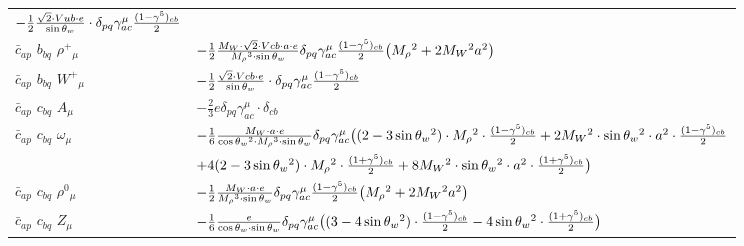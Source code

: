 \begin{center}
\begin{tabular}{|l|l|}
	$-\frac{1}{2}\frac{\sqrt{2} \cdot Vub \cdot e}{ \sin{\theta}_w}\cdot \delta_{p q} \gamma_{a c}^\mu {(1-\gamma^5)_{c b}\over 2} $\\[2mm]
$\bar{c}{}_{a p }$ \phantom{-} $b{}_{b q }$ \phantom{-} $\rho^+{}_{\mu }$ \phantom{-}  &
	$-\frac{1}{2}\frac{ M_W \cdot\sqrt{2} \cdot Vcb \cdot a \cdot e}{ M_\rho{}^3  \cdot \sin{\theta}_w}\delta_{p q} \gamma_{a c}^\mu {(1-\gamma^5)_{c b}\over 2} \big( M_\rho{}^2 +2 M_W{}^2  a{}^2 \big)$\\[2mm]
$\bar{c}{}_{a p }$ \phantom{-} $b{}_{b q }$ \phantom{-} $W^+{}_{\mu }$ \phantom{-}  &
	$-\frac{1}{2}\frac{\sqrt{2} \cdot Vcb \cdot e}{ \sin{\theta}_w}\cdot \delta_{p q} \gamma_{a c}^\mu {(1-\gamma^5)_{c b}\over 2} $\\[2mm]
$\bar{c}{}_{a p }$ \phantom{-} $c{}_{b q }$ \phantom{-} ${A}_{\mu }$ \phantom{-}  &
	$-\frac{2}{3} e\delta_{p q} \gamma_{a c}^\mu \cdot \delta_{c b} $\\[2mm]
$\bar{c}{}_{a p }$ \phantom{-} $c{}_{b q }$ \phantom{-} $\omega{}_{\mu }$ \phantom{-}  &
	$-\frac{1}{6}\frac{ M_W \cdot a \cdot e}{ \cos{\theta}_w{}^2  \cdot M_\rho{}^3  \cdot \sin{\theta}_w}\delta_{p q} \gamma_{a c}^\mu \big( (2-3 \sin{\theta}_w {}^2)\cdot  M_\rho{}^2 \cdot {(1-\gamma^5)_{c b}\over 2} +2 M_W{}^2 \cdot  \sin{\theta}_w{}^2 \cdot  a{}^2 \cdot {(1-\gamma^5)_{c b}\over 2} $ \\[2mm]
  & $+4 (2-3 \sin{\theta}_w {}^2)\cdot  M_\rho{}^2 \cdot {(1+\gamma^5)_{c b}\over 2} +8 M_W{}^2 \cdot  \sin{\theta}_w{}^2 \cdot  a{}^2 \cdot {(1+\gamma^5)_{c b}\over 2} \big)$\\[2mm]
$\bar{c}{}_{a p }$ \phantom{-} $c{}_{b q }$ \phantom{-} $\rho^0{}_{\mu }$ \phantom{-}  &
	$-\frac{1}{2}\frac{ M_W \cdot a \cdot e}{ M_\rho{}^3  \cdot \sin{\theta}_w}\delta_{p q} \gamma_{a c}^\mu {(1-\gamma^5)_{c b}\over 2} \big( M_\rho{}^2 +2 M_W{}^2  a{}^2 \big)$\\[2mm]
$\bar{c}{}_{a p }$ \phantom{-} $c{}_{b q }$ \phantom{-} ${Z}_{\mu }$ \phantom{-}  &
	$-\frac{1}{6}\frac{ e}{ \cos{\theta}_w \cdot \sin{\theta}_w}\delta_{p q} \gamma_{a c}^\mu \big( (3-4 \sin{\theta}_w {}^2)\cdot {(1-\gamma^5)_{c b}\over 2} -4 \sin{\theta}_w{}^2 \cdot {(1+\gamma^5)_{c b}\over 2} \big)$\\ \hline
\end{tabular}


\end{center}
